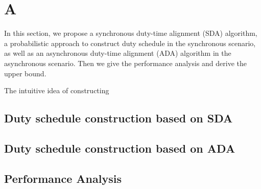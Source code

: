 \section{A}

In this section, we propose a synchronous duty-time alignment (SDA) algorithm, 
a probabilistic approach to construct duty schedule in the synchronous scenario, 
as well as an asynchronous duty-time alignment (ADA) algorithm in the asynchronous scenario.
Then we give the performance  analysis and derive the upper bound.

The intuitive idea of constructing

\subsection{Duty schedule construction based on SDA}

\subsection{Duty schedule construction based on ADA}

\subsection{Performance Analysis}

